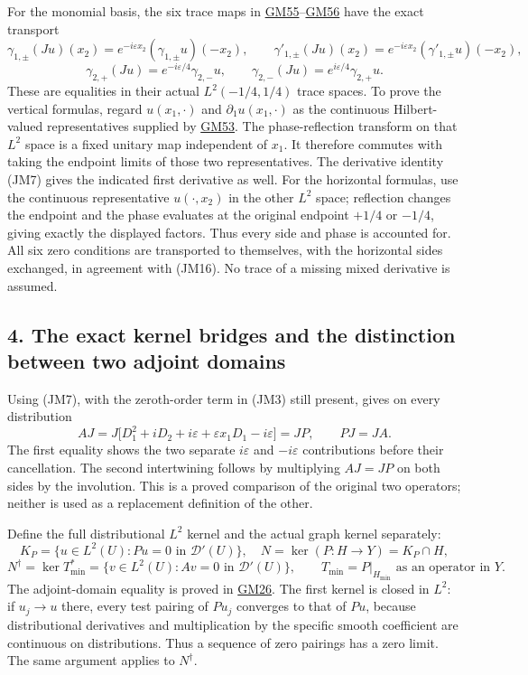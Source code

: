 \documentclass[
  11pt,
]{article}
\begin{document}
For the monomial basis, the six trace maps in
\href{../u006-graph-domains/graph-domain-note.html\#eq-GM55}{GM55}--\href{../u006-graph-domains/graph-domain-note.html\#eq-GM56}{GM56}
have the exact transport \[
 \gamma_{1,\pm}(Ju)(x_2)
     =e^{-i\varepsilon x_2}(\gamma_{1,\pm}u)(-x_2),
 \qquad
 \gamma'_{1,\pm}(Ju)(x_2)
     =e^{-i\varepsilon x_2}(\gamma'_{1,\pm}u)(-x_2),
\] \[
 \gamma_{2,+}(Ju)=e^{-i\varepsilon/4}\gamma_{2,-}u,\qquad
 \gamma_{2,-}(Ju)=e^{i\varepsilon/4}\gamma_{2,+}u .
 \tag{JM17}
\]
These are equalities in their actual \(L^2(-1/4,1/4)\) trace
spaces. To prove the vertical formulas, regard \(u(x_1,\cdot)\)
and \(\partial_1u(x_1,\cdot)\) as the continuous Hilbert-valued
representatives supplied by
\href{../u006-graph-domains/graph-domain-note.html\#eq-GM53}{GM53}. The
phase-reflection transform on that \(L^2\) space is a
fixed unitary map independent of \(x_1\). It therefore
commutes with taking the endpoint limits of those two representatives.
The derivative identity (JM7) gives the indicated first derivative as
well. For the horizontal formulas, use the continuous representative
\(u(\cdot,x_2)\) in the other \(L^2\) space;
reflection changes the endpoint and the phase evaluates at the original
endpoint \(+1/4\) or \(-1/4\), giving
exactly the displayed factors. Thus every side and phase is accounted
for. All six zero conditions are transported to themselves, with the
horizontal sides exchanged, in agreement with (JM16). No trace of a
missing mixed derivative is assumed.

\subsection{4. The exact kernel bridges and the distinction between two
adjoint
domains}\label{the-exact-kernel-bridges-and-the-distinction-between-two-adjoint-domains}

Using (JM7), with the zeroth-order term in (JM3) still present, gives on
every distribution \[
 AJ
   =J\bigl[D_1^2+iD_2+i\varepsilon+
                    \varepsilon x_1D_1-i\varepsilon\bigr]
   =JP,\qquad PJ=JA.
 \tag{JM18}
\] The first equality shows the
two separate \(i\varepsilon\) and \(-i\varepsilon\)
contributions before their cancellation. The second intertwining follows
by multiplying \(AJ=JP\) on both sides by the involution.
This is a proved comparison of the original two operators; neither is
used as a replacement definition of the other.

Define the full distributional \(L^2\) kernel and the
actual graph kernel separately: \[
 K_P=\{u\in L^2(U):Pu=0\text{ in }\mathcal D'(U)\},
 \quad N=\ker(P:H\to Y)=K_P\cap H,
\]
\[
 N^\dagger=\ker T_{\min}^*
       =\{v\in L^2(U):Av=0\text{ in }\mathcal D'(U)\},
 \qquad T_{\min}=P|_{H_{\min}}\text{ as an operator in }Y.
 \tag{JM19}
\] The adjoint-domain equality is proved in
\href{../u006-graph-domains/graph-domain-note.html\#eq-GM26}{GM26}. The
first kernel is closed in \(L^2\): if
\(u_j\to u\) there, every test pairing of
\(Pu_j\) converges to that of \(Pu\),
because distributional derivatives and multiplication by the specific
smooth coefficient are continuous on distributions. Thus a sequence of
zero pairings has a zero limit. The same argument applies to
\(N^\dagger\).
\end{document}

